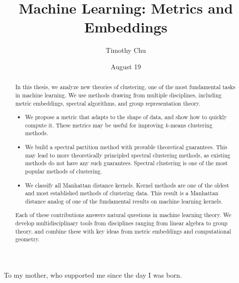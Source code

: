 \documentclass[12pt]{cmuthesis}
\begin{document}
 
\frontmatter

\pagestyle{empty}

\title{ 
{\bf Machine Learning: Metrics and Embeddings}}
\author{Timothy Chu}
\date{August 19}
\trnumber{}


\support{}
\disclaimer{}



\maketitle

\begin{dedication}
To my mother, who supported me since the day I was born.
\end{dedication}

\pagestyle{plain} %


\begin{abstract}
In this thesis, we analyze new theories of clustering, one of the most fundamental tasks in machine learning. We use methods drawing from multiple disciplines, including metric embeddings, spectral algorithms, and group representation theory.
\begin{itemize}
\item We propose a metric that adapts to the shape of data, and show how to quickly compute it. These metrics may be useful for improving $k$-means clustering methods.
\item We build a spectral partition method with provable theoretical guarantees. This may lead to more theoretically principled spectral clustering methods, as existing methods do not have any such guarantees. Spectral clustering is one of the most popular methods of clustering.
\item We classify all Manhattan distance kernels. Kernel methods are one of the oldest and most established methods of clustering data. This result is a Manhattan distance analog of one of the fundamental results on machine learning kernels. 
\end{itemize}
Each of these contributions answers natural questions in machine
  learning theory. We develop multidisciplinary tools from disciplines
  ranging from linear algebra to group theory, and combine these with
  key ideas from metric embeddings and computational geometry.

\end{abstract}
\iffalse
\end{document}
